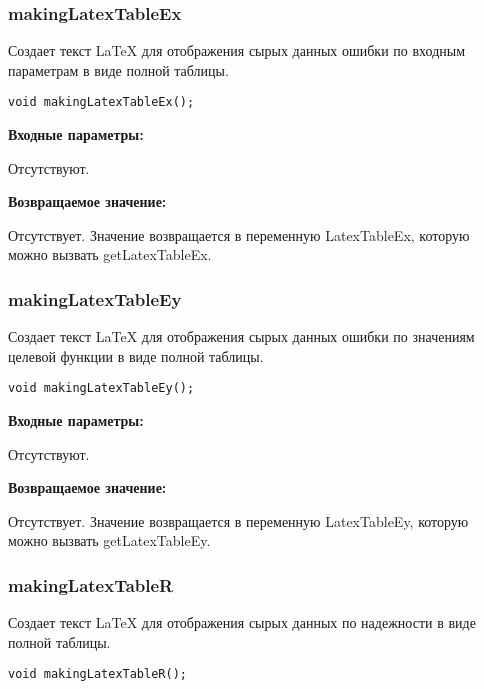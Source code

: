 \documentclass[a4paper,12pt]{article}
\begin{document}
\subsubsection{makingLatexTableEx}\label{makingLatexTableEx}

Создает текст LaTeX для отображения сырых данных ошибки по входным параметрам в виде полной таблицы.


\begin{lstlisting}[label=code_syntax_makingLatexTableEx,caption=Синтаксис]
void makingLatexTableEx();
\end{lstlisting}

\textbf{Входные параметры:}

Отсутствуют.

\textbf{Возвращаемое значение:}

Отсутствует. Значение возвращается в переменную LatexTableEx, которую можно вызвать getLatexTableEx.


\subsubsection{makingLatexTableEy}\label{makingLatexTableEy}

Создает текст LaTeX для отображения сырых данных ошибки по значениям целевой функции в виде полной таблицы.


\begin{lstlisting}[label=code_syntax_makingLatexTableEy,caption=Синтаксис]
void makingLatexTableEy();
\end{lstlisting}

\textbf{Входные параметры:}

Отсутствуют.

\textbf{Возвращаемое значение:}

Отсутствует. Значение возвращается в переменную LatexTableEy, которую можно вызвать getLatexTableEy.


\subsubsection{makingLatexTableR}\label{makingLatexTableR}

Создает текст LaTeX для отображения сырых данных по надежности в виде полной таблицы.


\begin{lstlisting}[label=code_syntax_makingLatexTableR,caption=Синтаксис]
void makingLatexTableR();
\end{lstlisting}
\end{document}
